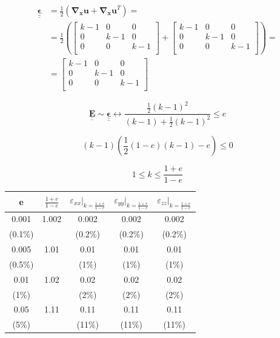 \documentclass
[
a4paper,                      %
twoside,					  %
12pt,                         %
abstract,		      %
fleqn,                        %
]
{scrartcl} %
\begin{document}
\begin{equation}
\begin{aligned}
\mathbf{\underline{\underline{\epsilon}}}&=\frac{1}{2}\left(\mathbf{\nabla_{x}u}+\mathbf{\nabla_{x}u}^{T}\right)=\\
&=\frac{1}{2}\left(\begin{bmatrix}
k-1&0&0\\[5pt]
0&k-1&0\\[5pt]
0&0&k-1\\[5pt]\end{bmatrix}+\begin{bmatrix}
k-1&0&0\\[5pt]
0&k-1&0\\[5pt]
0&0&k-1\\[5pt]\end{bmatrix}\right)=\\
&=\begin{bmatrix}
k-1&0&0\\[5pt]
0&k-1&0\\[5pt]
0&0&k-1\\[5pt]\end{bmatrix}
\end{aligned}
\end{equation}

\begin{equation}
\mathbf{\underline{\underline{E}}}\sim\mathbf{\underline{\underline{\epsilon}}}\longleftrightarrow\frac{\frac{1}{2}\left(k-1\right)^{2}}{\left(k-1\right)+\frac{1}{2}\left(k-1\right)^{2}}\leq e
\end{equation}

\begin{equation}
\left(k-1\right)\left(\frac{1}{2}\left(1-e\right)\left(k-1\right)-e\right)\leq 0
\end{equation}

\begin{equation}
1\leq k\leq\frac{1+e}{1-e}
\end{equation}

\begin{tabular}{ccccc}
e&$\frac{1+e}{1-e}$&$\varepsilon_{xx}\rvert_{k=\frac{1+e}{1-e}}$&$\varepsilon_{yy}\rvert_{k=\frac{1+e}{1-e}}$&$\varepsilon_{zz}\rvert_{k=\frac{1+e}{1-e}}$\\
\toprule
\midrule
0.001&1.002&0.002&0.002&0.002\\
(0.1\%)&&(0.2\%)&(0.2\%)&(0.2\%)\\
\midrule
0.005&1.01&0.01&0.01&0.01\\
(0.5\%)&&(1\%)&(1\%)&(1\%)\\
\midrule
0.01&1.02&0.02&0.02&0.02\\
(1\%)&&(2\%)&(2\%)&(2\%)\\
\midrule
0.05&1.11&0.11&0.11&0.11\\
(5\%)&&(11\%)&(11\%)&(11\%)\\
\end{tabular}
\end{document}
